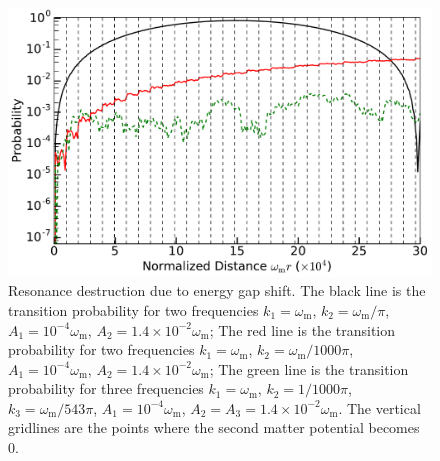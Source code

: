 \documentclass[%
reprint,
 amsmath,amssymb,
 aps,
]{revtex4-1}
\begin{document}
\begin{figure}
    \centering
    \includegraphics[width=\columnwidth]{assets/interference-reduction-three-modes}
    \caption{Resonance destruction due to energy gap shift. The black line is the transition probability for two frequencies $k_1=\omega_{\mathrm m}$, $k_2=\omega_{\mathrm m}/\pi$, $A_1=10^{-4}\omega_{\mathrm m}$, $A_2 = 1.4\times 10^{-2}\omega_{\mathrm m}$; The red line is the transition probability for two frequencies $k_1=\omega_{\mathrm m}$, $k_2=\omega_{\mathrm m}/1000 \pi$, $A_1=10^{-4}\omega_{\mathrm m}$, $A_2 = 1.4\times 10^{-2}\omega_{\mathrm m}$; The green line is the transition probability for three frequencies $k_1=\omega_{\mathrm m}$, $k_2=1/1000\pi$, $k_3=\omega_{\mathrm m}/543\pi$, $A_1=10^{-4}\omega_{\mathrm m}$, $A_2 =A_3 = 1.4\times10^{-2}\omega_{\mathrm m}$. The vertical gridlines are the points where the second matter potential becomes 0.}
    \label{fig-interference-reduction-three-modes}
\end{figure}



















\end{document}
